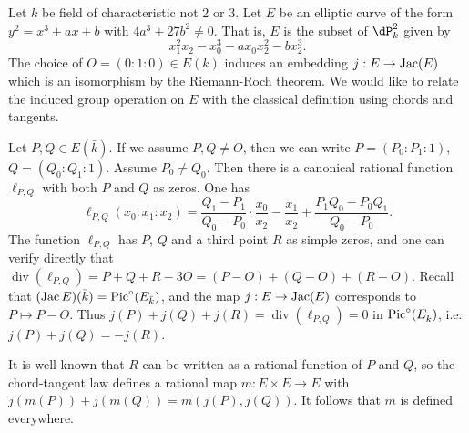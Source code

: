 \begin{example}
Let $k$ be field of characteristic not $2$ or $3$. Let $E$ be an elliptic curve 
of the form $y^2=x^3+a x+b$ with $4 a^3+27 b^2\ne 0$. That is, $E$ is the 
subset of $\dP_k^2$ given by 
\[
  x_1^2 x_2 - x_0^3 - a x_0 x_2^2 - b x_2^3 \text{.}
\]
The choice of $O=(0:1:0)\in E(k)$ induces an embedding $j:E\to \operatorname{Jac}(E)$ which 
is an isomorphism by the Riemann-Roch theorem. We would like to relate the 
induced group operation on $E$ with the classical definition using chords and 
tangents. 

Let $P,Q\in E(\bar k)$. If we assume $P,Q\ne O$, then we can write 
$P=(P_0:P_1:1)$, $Q=(Q_0:Q_1:1)$. Assume $P_0\ne Q_0$. Then there is a 
canonical rational function $\ell_{P,Q}$ with both $P$ and $Q$ as zeros. One 
has  
\[
 \ell_{P,Q}(x_0:x_1:x_2) = \frac{Q_1-P_1}{Q_0-P_0} \cdot \frac{x_0}{x_2} - \frac{x_1}{x_2} + \frac{P_1 Q_0 - P_0 Q_1}{Q_0-P_0} \text{.}
\]
The function $\ell_{P,Q}$ has $P$, $Q$ and a third point $R$ as simple zeros, 
and one can verify directly that 
$\operatorname{div}(\ell_{P,Q})=P+Q+R-3 O = (P-O)+(Q-O)+(R-O)$. Recall that 
$(\operatorname{Jac} E)(\bar k)=\operatorname{Pic}^\circ(E_{\bar k})$, and the map $j:E\to \operatorname{Jac}(E)$ 
corresponds to $P\mapsto P-O$. Thus 
$j(P)+j(Q)+j(R)=\operatorname{div}(\ell_{P,Q})=0$ in 
$\operatorname{Pic}^\circ(E_{\bar k})$, i.e. $j(P)+j(Q)=-j(R)$. 

It is well-known that $R$ can be written as a rational function of $P$ and $Q$, 
so the chord-tangent law defines a rational map $m:E\times E\to E$ with 
$j(m(P))+j(m(Q))=m(j(P),j(Q))$. It follows that $m$ is defined everywhere. 
\end{example}








